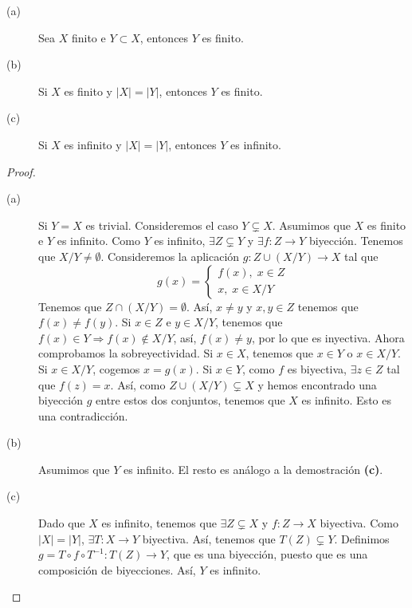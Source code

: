\begin{fprop}[]
\normalfont 
\begin{description}
\item[(a)] Sea $\displaystyle X $ finito e $\displaystyle Y \subset X $, entonces $\displaystyle Y $ es finito.
\item[(b)] Si $\displaystyle X $ es finito y $\displaystyle \left|X\right|= \left|Y\right| $, entonces $\displaystyle Y $ es finito.
\item[(c)] Si $\displaystyle X $ es infinito y $\displaystyle \left|X\right| = \left|Y\right| $, entonces $\displaystyle Y $ es infinito.
\end{description}
\end{fprop}
\begin{proof}
\begin{description}
\item[(a)] Si $\displaystyle Y = X $ es trivial. Consideremos el caso $\displaystyle Y \subsetneq X $. Asumimos que $\displaystyle X $ es finito e $\displaystyle Y $ es infinito. Como $\displaystyle Y $ es infinito, $\displaystyle \exists Z \subsetneq Y $ y $\displaystyle \exists f : Z \to Y $ biyección. Tenemos que $\displaystyle X / Y \neq \emptyset $. Consideremos la aplicación $\displaystyle g : Z \cup \left(X / Y\right) \to X $ tal que
	\[
	g\left(x\right) = 
\begin{cases}
f\left(x\right), \; x \in Z \\
x, \; x \in X / Y
\end{cases}
\]
Tenemos que $\displaystyle Z \cap \left(X / Y\right) = \emptyset $. Así, $\displaystyle x \neq y $ y $\displaystyle x, y \in Z $ tenemos que $\displaystyle f\left(x\right) \neq f\left(y\right) $. Si $\displaystyle x \in Z $ e $\displaystyle y \in X / Y $, tenemos que $\displaystyle f\left(x\right)  \in Y \Rightarrow f\left(x\right) \not\in X/Y$, así, $\displaystyle f\left(x\right) \neq y $, por lo que es inyectiva. 
Ahora comprobamos la sobreyectividad. Si $\displaystyle x \in X $, tenemos que $\displaystyle x \in Y $ o $\displaystyle x \in X / Y $. Si $\displaystyle x \in X /Y $, cogemos $\displaystyle x = g\left(x\right) $. Si $\displaystyle x \in Y $, como $\displaystyle f $ es biyectiva, $\displaystyle \exists z \in Z $ tal que $\displaystyle f\left(z\right) = x $. Así, como $\displaystyle Z \cup \left(X /Y\right) \subsetneq X $ y hemos encontrado una biyección $\displaystyle g $ entre estos dos conjuntos, tenemos que $\displaystyle X $ es infinito. Esto es una contradicción.
\item[(b)] Asumimos que $\displaystyle Y $ es infinito. El resto es análogo a la demostración \textbf{(c)}. 
\item[(c)] Dado que $\displaystyle X $ es infinito, tenemos que $\displaystyle \exists Z \subsetneq X $ y $\displaystyle f : Z \to X $ biyectiva. Como $\displaystyle \left|X\right| = \left|Y\right| $, $\displaystyle \exists T : X \to Y $ biyectiva. Así, tenemos que $\displaystyle T\left(Z\right) \subsetneq Y $. Definimos $\displaystyle g = T \circ f \circ T ^{-1} : T\left(Z\right) \to Y $, que es una biyección, puesto que es una composición de biyecciones. Así, $\displaystyle Y $ es infinito.
\end{description}
\end{proof}

